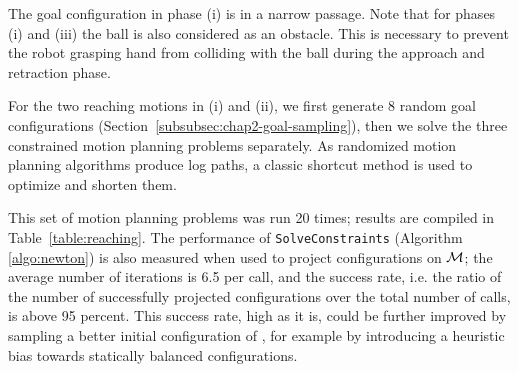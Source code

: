 The goal configuration in phase (i) is in a narrow passage. Note that
for phases (i) and (iii) the ball is also considered as an
obstacle. This is necessary to prevent the robot grasping hand from
colliding with the ball during the approach and retraction phase.

For the two reaching motions in (i) and (ii), we first generate 8
random goal configurations
(Section~\ref{subsubsec:chap2-goal-sampling}), then we solve the three
constrained motion planning problems separately. As randomized motion
planning algorithms produce log paths, a classic shortcut method is
used to optimize and shorten them.

This set of motion planning problems was run 20 times; results are
compiled in Table~\ref{table:reaching}. The performance of
\texttt{SolveConstraints} (Algorithm \ref{algo:newton}) is also
measured when used to project configurations on $\mathcal{M}$; the
average number of iterations is 6.5 per call, and the success rate,
i.e. the ratio of the number of successfully projected configurations
over the total number of calls, is above 95 percent. This success
rate, high as it is, could be further improved by sampling a better
initial configuration of {\cspace}, for example by introducing a
heuristic bias towards statically balanced configurations.


